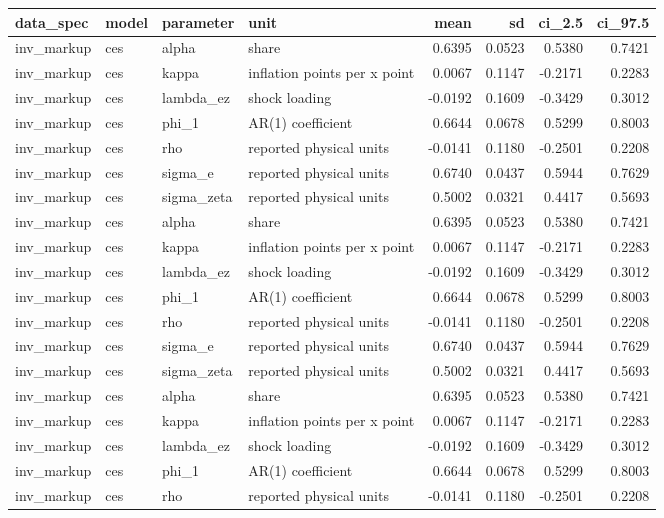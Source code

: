 \begin{tabular}{llllrrrr}
\toprule
data\_spec & model & parameter & unit & mean & sd & ci\_2.5 & ci\_97.5 \\
\midrule
inv\_markup & ces & alpha & share & 0.6395 & 0.0523 & 0.5380 & 0.7421 \\
inv\_markup & ces & kappa & inflation points per x point & 0.0067 & 0.1147 & -0.2171 & 0.2283 \\
inv\_markup & ces & lambda\_ez & shock loading & -0.0192 & 0.1609 & -0.3429 & 0.3012 \\
inv\_markup & ces & phi\_1 & AR(1) coefficient & 0.6644 & 0.0678 & 0.5299 & 0.8003 \\
inv\_markup & ces & rho & reported physical units & -0.0141 & 0.1180 & -0.2501 & 0.2208 \\
inv\_markup & ces & sigma\_e & reported physical units & 0.6740 & 0.0437 & 0.5944 & 0.7629 \\
inv\_markup & ces & sigma\_zeta & reported physical units & 0.5002 & 0.0321 & 0.4417 & 0.5693 \\
inv\_markup & ces & alpha & share & 0.6395 & 0.0523 & 0.5380 & 0.7421 \\
inv\_markup & ces & kappa & inflation points per x point & 0.0067 & 0.1147 & -0.2171 & 0.2283 \\
inv\_markup & ces & lambda\_ez & shock loading & -0.0192 & 0.1609 & -0.3429 & 0.3012 \\
inv\_markup & ces & phi\_1 & AR(1) coefficient & 0.6644 & 0.0678 & 0.5299 & 0.8003 \\
inv\_markup & ces & rho & reported physical units & -0.0141 & 0.1180 & -0.2501 & 0.2208 \\
inv\_markup & ces & sigma\_e & reported physical units & 0.6740 & 0.0437 & 0.5944 & 0.7629 \\
inv\_markup & ces & sigma\_zeta & reported physical units & 0.5002 & 0.0321 & 0.4417 & 0.5693 \\
inv\_markup & ces & alpha & share & 0.6395 & 0.0523 & 0.5380 & 0.7421 \\
inv\_markup & ces & kappa & inflation points per x point & 0.0067 & 0.1147 & -0.2171 & 0.2283 \\
inv\_markup & ces & lambda\_ez & shock loading & -0.0192 & 0.1609 & -0.3429 & 0.3012 \\
inv\_markup & ces & phi\_1 & AR(1) coefficient & 0.6644 & 0.0678 & 0.5299 & 0.8003 \\
inv\_markup & ces & rho & reported physical units & -0.0141 & 0.1180 & -0.2501 & 0.2208 \\

\end{tabular}
